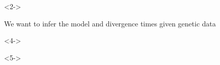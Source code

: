 \begin{frame}[t,label=fullmodel]
    \vspace{-1mm}

    \begin{minipage}[t][0.45\textheight][t]{\linewidth}
        \begin{onlyenv}<2->
            \begin{center}
                We want to infer the model and divergence times given genetic data
            \end{center}
        \end{onlyenv}

        \vspace{-3mm}
        \begin{onlyenv}<4->
            \begin{displaybox}[0.60\linewidth]
                \vspace{-1.3mm}

                \vspace{-5mm}

            \end{displaybox}
        \end{onlyenv}

        \vspace{0.5mm}
        \begin{onlyenv}<5->
            \begin{displaybox}[0.60\linewidth]
                \vspace{-4.1mm}



\end{displaybox}
\end{onlyenv}
\end{minipage}
\end{frame}

